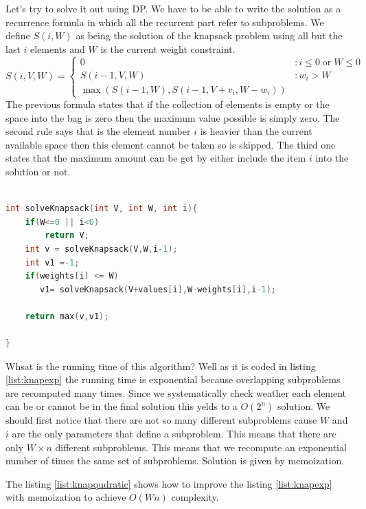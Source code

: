 Let's try to solve it out using DP. We have to be able to write the solution as a recurrence formula in which all the recurrent part refer to subproblems.
We define $S(i,W)$ as being the solution of the knapsack problem using  all but the last $i$ elements and $W$ is the current weight constraint.
\[S(i,V,W) = \left\{
  \begin{array}{lr}
    0  &: i \leq 0 \; \mbox{or} \; W\leq 0\\
    S(i-1,V,W) &: w_i > W \\
    \max(S(i-1,W),S(i-1,V+v_i,W-w_i))
  \end{array}
\right.
\]
The previous formula states that if the collection of elements is empty or the space into the bag is zero then the maximum value possible is simply zero.
The second rule says that is the element number $i$ is heavier than the current available space then this element cannot be taken so is skipped.
The third one states that the maximum amount can be get by either include the item $i$ into the solution or not. 

\begin{lstlisting}[language=c++, caption="Binary knapsack problem - exponential",label=list:knapexp]

int solveKnapsack(int V, int W, int i){
    if(W<=0 || i<0)
        return V;
    int v = solveKnapsack(V,W,i-1);
    int v1 =-1;
    if(weights[i] <= W)
       v1= solveKnapsack(V+values[i],W-weights[i],i-1);
        
    return max(v,v1);
    
}

	\end{lstlisting}

Whsat is the running time of this algorithm? Well as it is coded in listing \ref{list:knapexp} the running time is exponential because overlapping subproblems are recomputed many times.
Since we systematically check weather each element can be or cannot be in the final solution this yelds to a $O(2^n)$ solution.
We should first notice that there are not so many different subproblems cause $W$ and $i$ are the only parameters that define a subproblem. This means that there are only $W \times n$ different subproblems. This means that we recompute an exponential number of times the same set of subproblems. Solution is given by memoization. 

The listing \ref{list:knapqudratic} shows how to improve the listing \ref{list:knapexp} with memoization to achieve $O(W n)$ complexity.


